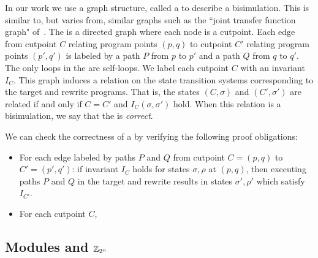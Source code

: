 In our work we use a graph structure, called a \emph{\bisimrep}
to describe a bisimulation. This is similar to, but varies from,
similar graphs such as the ``joint transfer function graph"
of~\cite{Dahiya17ASPLAS}. The \bisimrep{} is a directed graph where
each node is a cutpoint. Each edge from cutpoint $C$ relating program
points $(p,q)$ to cutpoint $C'$ relating program points $(p',q')$ is
labeled by a path $P$ from $p$ to $p'$ and a path $Q$ from $q$ to
$q'$. The only loops in the \bisimrep{} are self-loops. We label each
cutpoint $C$ with an invariant $I_C$. This graph induces a relation on
the state transition systems corresponding to the target and rewrite
programs. That is, the states $(C, \sigma)$ and $(C', \sigma')$ are
related if and only if $C = C'$ and $I_C(\sigma,\sigma')$ hold. When
this relation is a bisimulation, we say that the \bisimrep{} is
\emph{correct}.

We can check the correctness of a \bisimrep{} by
verifying the following proof obligations:

\begin{itemize}
\item For each edge labeled by paths $P$ and $Q$ from cutpoint $C =
(p,q)$ to $C' = (p',q')$: if invariant $I_C$ holds for states $\sigma,
\rho$ at $(p,q)$, then executing paths $P$ and $Q$ in the target and rewrite
results in states $\sigma',\rho'$ which satisfy $I_{C'}$.
\item For each cutpoint $C$, 
\end{itemize}

\subsection{Modules and $\mathbb{Z}_{2^{n}}$}

